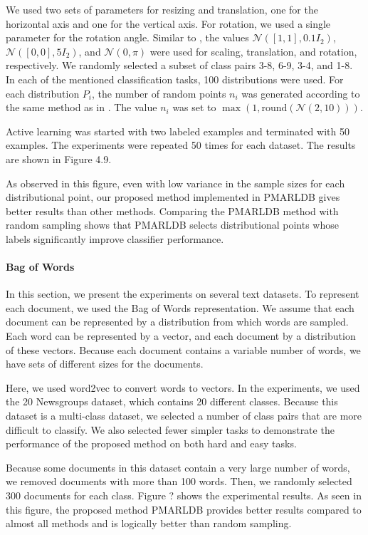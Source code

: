 \documentclass[12pt]{article}
\begin{document}
	We used two sets of parameters for resizing and translation, one for the horizontal axis and one for the vertical axis. For rotation, we used a single parameter for the rotation angle. Similar to \cite{sriperumbudur2009kernel}, the values $\mathcal{N}([1, 1], 0.1 I_2)$, $\mathcal{N}([0, 0], 5 I_2)$, and $\mathcal{N}(0, \pi)$ were used for scaling, translation, and rotation, respectively. We randomly selected a subset of class pairs 3-8, 6-9, 3-4, and 1-8. In each of the mentioned classification tasks, 100 distributions were used. For each distribution $P_i$, the number of random points $n_i$ was generated according to the same method as in \cite{sriperumbudur2009kernel}. The value $n_i$ was set to $\max(1, \text{round}(\mathcal{N}(2, 10)))$.
	
	Active learning was started with two labeled examples and terminated with 50 examples. The experiments were repeated 50 times for each dataset. The results are shown in Figure 4.9.
	
	As observed in this figure, even with low variance in the sample sizes for each distributional point, our proposed method implemented in PMARLDB gives better results than other methods. Comparing the PMARLDB method with random sampling shows that PMARLDB selects distributional points whose labels significantly improve classifier performance.
	
	\paragraph{Bag of Words}
	In this section, we present the experiments on several text datasets. To represent each document, we used the Bag of Words representation. We assume that each document can be represented by a distribution from which words are sampled. Each word can be represented by a vector, and each document by a distribution of these vectors. Because each document contains a variable number of words, we have sets of different sizes for the documents.
	
	Here, we used word2vec \cite{mikolov2013distributed} to convert words to vectors. In the experiments, we used the 20 Newsgroups dataset, which contains 20 different classes. Because this dataset is a multi-class dataset, we selected a number of class pairs that are more difficult to classify. We also selected fewer simpler tasks to demonstrate the performance of the proposed method on both hard and easy tasks.
	
	Because some documents in this dataset contain a very large number of words, we removed documents with more than 100 words. Then, we randomly selected 300 documents for each class. Figure ? shows the experimental results. As seen in this figure, the proposed method PMARLDB provides better results compared to almost all methods and is logically better than random sampling.
	
\end{document}
